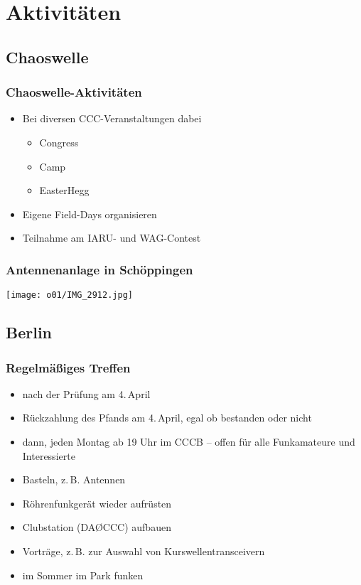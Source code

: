 \section{Aktivitäten}
\subsection{Chaoswelle}
\begin{frame}
  \frametitle{Chaoswelle-Aktivitäten}
  \begin{itemize}
    \item Bei diversen CCC-Veranstaltungen dabei
      \begin{itemize}
        \item Congress
        \item Camp 
        \item EasterHegg 
      \end{itemize}
    \item Eigene Field-Days organisieren
    \item Teilnahme am IARU- und WAG-Contest 
  \end{itemize}
\end{frame}

\begin{frame}
  \frametitle{Antennenanlage in Schöppingen}
  \begin{center}%
    \texttt{[image: o01/IMG\_2912.jpg]}%
    \par%
  \end{center}%
\end{frame}

\subsection{Berlin}
\begin{frame}
  \frametitle{Regelmäßiges Treffen}
  \begin{itemize}
    \item {} nach der Prüfung am 4.\,April
    \item Rückzahlung des Pfands am 4.\,April, egal ob bestanden oder nicht
    \item dann, jeden Montag ab 19 Uhr im CCCB -- offen für alle Funkamateure und Interessierte
    \item Basteln, z.\,B. Antennen
    \item Röhrenfunkgerät wieder aufrüsten
    \item Clubstation (DAØCCC) aufbauen
    \item Vorträge, z.\,B. zur Auswahl von Kurswellentransceivern
    \item im Sommer im Park funken
  \end{itemize}
\end{frame}

